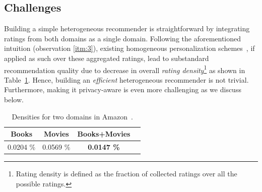 

\subsection{Challenges}

Building a simple heterogeneous recommender is straightforward by integrating ratings from both domains as a single domain. 
Following the aforementioned intuition (observation \ref{itm:3}), existing homogeneous personalization schemes~\cite{schafer2007collaborative, resnick1994grouplens, sarwar2001item}, if applied as such over these aggregated ratings, lead to substandard recommendation quality due to decrease in overall \emph{rating density}\footnote{Rating density is defined as the fraction of collected ratings over all the possible ratings.} as shown in Table~\ref{tab:density}. Hence, building an \emph{efficient} heterogeneous recommender is not trivial. Furthermore, making it privacy-aware is even more challenging as we discuss below.


\begin{table}[h!]
\centering
\vspace{-2mm}
\begin{tabular}{|c|c|c|c|} 
 \hline
 Books & Movies & Books+Movies\\ [0.5ex] 
 \hline
 0.0204 \% & 0.0569 \% & {\bf 0.0147 \%} \\ [1ex] 
 \hline
\end{tabular}
\caption{Densities for two domains in Amazon~\cite{mcauley2013hidden}.}
\vspace{-3mm}
\label{tab:density}
\end{table}

